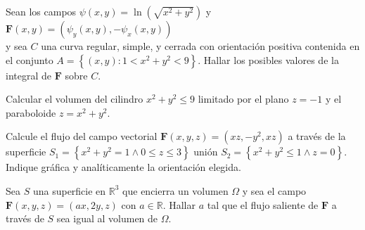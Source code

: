 
\begin{question}
    Sean los campos $\psi (x,y) = \ln(\sqrt{x^2+y^2})$ y $\boldsymbol{F}(x,y)= \left(\psi_y(x,y), -\psi_x(x,y)\right)$
    \\y sea $C$ una curva regular, simple, y cerrada con orientación positiva contenida en el conjunto
    $A=\left\{(x,y): 1 < x^2+y^2 < 9 \right\}$. Hallar los posibles valores de la integral de $\boldsymbol{F}$ sobre $C$.
\end{question}


\begin{question}
    Calcular el volumen del cilindro $x^2+y^2 \leq 9$ limitado por el plano $z=-1$ y el
    paraboloide $z=x^2+y^2$.
\end{question}


\begin{question}
    Calcule el flujo del campo vectorial $\boldsymbol{F}(x,y,z)= (xz,-y^2,xz)$ a través de la superficie
    $S_1=\left\{x^2+y^2=1 \land 0\leq z \leq 3\right\}$ unión $S_2=\left\{x^2+y^2\leq 1 \land z=0\right\}$.
    Indique gráfica y analíticamente la orientación elegida.
\end{question}



\begin{question}
    Sea $S$ una superficie en $\mathbb{R}^3$ que encierra un volumen $\Omega$ y sea el campo
    $\boldsymbol{F}(x,y,z)=(ax,2y,z)$ con $a \in \mathbb{R}$. Hallar $a$ tal que el flujo saliente de $\boldsymbol{F}$ a través de $S$
    sea igual al volumen de $\Omega$.
\end{question}

